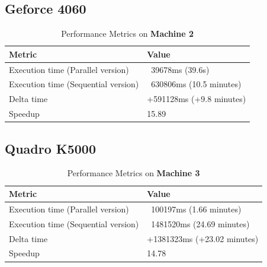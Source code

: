         
        \subsection{Geforce 4060}
        
        \begin{table}[H]
            \centering
            \begin{tabular}{|l|l|}
            \hline
            \textbf{Metric}                         & \textbf{Value}                       \\ \hline
            Execution time (Parallel version)       & ~39678ms (39.6s)                     \\ \hline
            Execution time (Sequential version)     & ~630806ms (10.5 minutes)             \\ \hline
            Delta time                               & +591128ms (+9.8 minutes)             \\ \hline
            Speedup                                  & 15.89                                 \\ \hline
            \end{tabular}
            \caption{Performance Metrics on \textbf{Machine 2}}
            \label{table:performance_metrics_test6_machine2}
        \end{table}
        
        
        \subsection{Quadro K5000}
        
        \begin{table}[H]
            \centering
            \begin{tabular}{|l|l|}
            \hline
            \textbf{Metric}                         & \textbf{Value}                       \\ \hline
            Execution time (Parallel version)       & ~100197ms (1.66 minutes)             \\ \hline
            Execution time (Sequential version)     & ~1481520ms (24.69 minutes)           \\ \hline
            Delta time                               & +1381323ms (+23.02 minutes)          \\ \hline
            Speedup                                  & 14.78                                 \\ \hline
            \end{tabular}
            \caption{Performance Metrics on \textbf{Machine 3}}
            \label{table:performance_metrics_test6_machine3}
        \end{table} 
